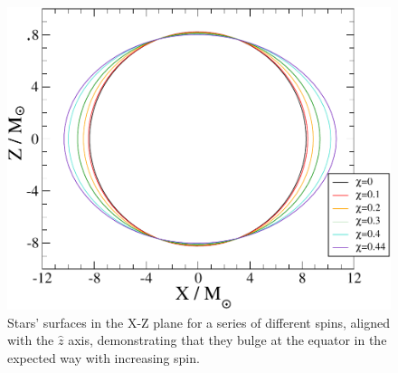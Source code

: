 \documentclass[aps,prd,amsmath,floatfix
,twocolumn
,superscriptaddress,nofootinbib,showpacs]{revtex4-1}
\theoremstyle{plain} \newtheorem{thm}{Theorem} \newtheorem{lem}{Lemma}
\begin{document}
\begin{figure}
\includegraphics[width=0.98\columnwidth]{Bulging}
\caption{{\label{fig:Bulging}}Stars' surfaces in the X-Z plane for a
  series of different spins, aligned with the $\hat{z}$ axis,
  demonstrating that they bulge at the equator in the expected way
  with increasing spin.}
\end{figure}

\end{document}

